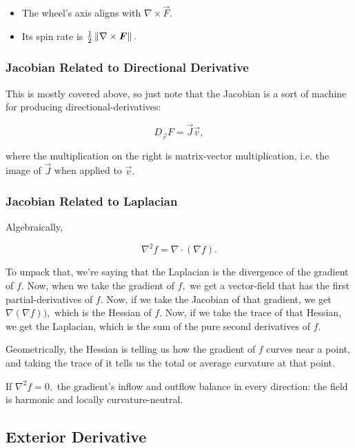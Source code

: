 \documentclass{article}
\begin{document}
\begin{itemize}
\item The wheel's axis aligns with $\nabla \times \vec{F}.$
\end{itemize}

\begin{itemize}
\item Its spin rate is $\frac{1}{2} \left\lVert \nabla \times \boldsymbol{F} \right\rVert.$ 
\end{itemize}

\subsubsection{Jacobian Related to Directional Derivative}
This is mostly covered above, so just note that the \@{Jacobian} is a sort of machine for producing \@{directional-derivatives}:

\[ D_\vec{v} F = \vec{J} \vec{v}, \]

where the multiplication on the right is matrix-vector multiplication, i.e. the image of $\vec{J}$ when applied to $\vec{v}.$

\subsubsection{Jacobian Related to Laplacian}

Algebraically,

\[ \nabla^2 f  = \nabla \cdot (\nabla f). \]

To unpack that, we're saying that the \@{Laplacian} is the \@{divergence} of the \@{gradient} of $f.$ Now, when we take the \@{gradient} of $f,$ we get a \@{vector-field} that has the first \@{partial-derivatives} of $f.$  Now, if we take the \@{Jacobian} of that \@{gradient}, we get $\nabla (\nabla f)),$ which is the \@{Hessian} of $f.$ Now, if we take the \@{trace} of that \@{Hessian}, we get the \@{Laplacian}, which is the sum of the pure second \@{derivatives} of $f.$

Geometrically, the \@{Hessian} is telling us how the \@{gradient} of $f$ curves near a point, and taking the trace of it tells us the total or average \@{curvature} at that point.

If $\nabla^2 f = 0,$ the gradient's inflow and outflow balance in every direction: the field is \@{harmonic} and locally curvature-neutral. 

\subsection{Exterior Derivative}
\end{document}
